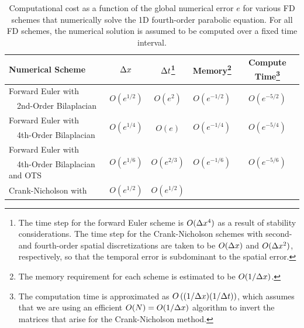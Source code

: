 \documentclass[oneeqnum,onefignum,onetabnum,onethmnum]{siamltex}
\begin{document}
\begin{table}[tbh]
\caption{\label{tab:comp_perf_vs_err_4th_order_parabolic} 
   Computational cost as a function of the global numerical error $e$
   for various FD schemes that numerically solve the 1D fourth-order
   parabolic equation.  For all FD schemes, the numerical solution is 
   assumed to be computed over a fixed time interval.
}
\begin{minipage}{\textwidth}
\begin{center} \footnotesize
\renewcommand{\arraystretch}{1.3}
\begin{tabular}{|l|c|c|c|c|}
  \hline
  {\bf Numerical Scheme} & $\Delta x$ 
  & $\Delta t$\footnote{The time step for the forward Euler scheme is $O(\Delta x^4)$
   as a result of stability considerations.  The time step for the 
   Crank-Nicholson schemes with second- and fourth-order spatial 
   discretizations are taken to be $O(\Delta x)$ and $O(\Delta x^2)$, respectively, so 
   that the temporal error is subdominant to the spatial error.}
  & {\bf Memory}\footnote{The memory requirement for each scheme is estimated 
    to be $O(1/\Delta x)$.} 
  & {\bf Compute Time}\footnote{The computation time is approximated as 
    $O\left( (1/\Delta x) (1/\Delta t) \right)$, which assumes that we are using an 
    efficient $O(N) = O(1/\Delta x)$ algorithm to invert the matrices that 
    arise for the Crank-Nicholson method.}  \\
  \hline 
  Forward Euler with 
    & \multirow{2}{*}{$O\left( e^{1/2} \right)$} 
    & \multirow{2}{*}{$O\left( e^{2} \right)$}
    & \multirow{2}{*}{$O\left( e^{-1/2} \right)$} 
    & \multirow{2}{*}{$O\left( e^{-5/2} \right)$} \\
  \ \ 2nd-Order Bilaplacian & & & & \\
  \hline 
  Forward Euler with 
    & \multirow{2}{*}{$O\left( e^{1/4} \right)$}
    & \multirow{2}{*}{$O\left( e \right)$}
    & \multirow{2}{*}{$O\left( e^{-1/4} \right)$} 
    & \multirow{2}{*}{$O\left( e^{-{5/4}} \right)$} \\
  \ \ 4th-Order Bilaplacian & & & & \\
  \hline 
  Forward Euler with 
    & \multirow{2}{*}{$O\left( e^{1/6} \right)$} 
    & \multirow{2}{*}{$O\left( e^{2/3} \right)$} 
    & \multirow{2}{*}{$O\left( e^{-1/6} \right)$} 
    & \multirow{2}{*}{$O\left( e^{-5/6} \right)$} \\ 
  \ \ 4th-Order Bilaplacian and OTS & & & & \\
  \hline 
  Crank-Nicholson with 
    & \multirow{2}{*}{$O\left( e^{1/2} \right)$} 
    & \multirow{2}{*}{$O\left( e^{1/2} \right)$} 

\end{tabular}
\end{center}
\end{minipage}
\end{table}
\end{document}
